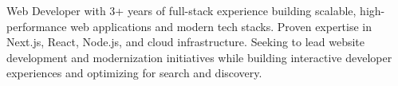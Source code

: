 \documentclass[letter,10pt]{article}
\begin{document}
Web Developer with 3+ years of full-stack experience building scalable, high-performance web applications and modern tech stacks. Proven expertise in Next.js, React, Node.js, and cloud infrastructure. Seeking to lead website development and modernization initiatives while building interactive developer experiences and optimizing for search and discovery.
\end{document}
